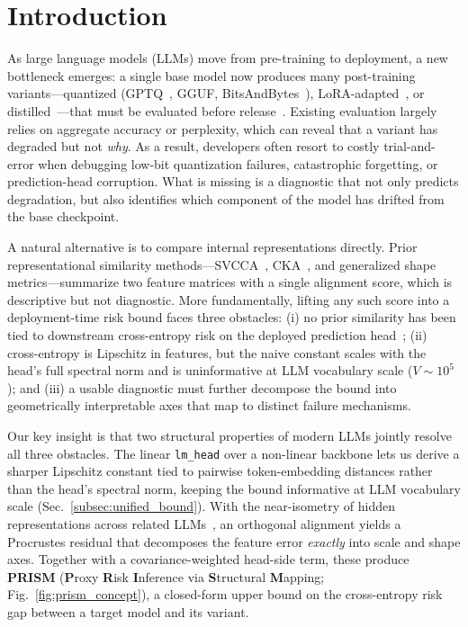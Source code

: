 \section{Introduction}

As large language models (LLMs) move from pre-training to deployment, a new bottleneck emerges: a single base model now produces many post-training variants---quantized (GPTQ~\cite{frantar2022gptq}, GGUF, BitsAndBytes~\cite{dettmers2022gpt3}), LoRA-adapted~\cite{hu2022lora}, or distilled~\cite{hinton2015distilling}---that must be evaluated before release~\cite{grattafiori2024llama, qwen2025qwen3}. Existing evaluation largely relies on aggregate accuracy or perplexity, which can reveal that a variant has degraded but not \emph{why}. As a result, developers often resort to costly trial-and-error when debugging low-bit quantization failures, catastrophic forgetting, or prediction-head corruption. What is missing is a diagnostic that not only predicts degradation, but also identifies which component of the model has drifted from the base checkpoint.

A natural alternative is to compare internal representations directly. Prior representational similarity methods---SVCCA~\cite{raghu2017svcca}, CKA~\cite{kornblith2019similarity}, and generalized shape metrics---summarize two feature matrices with a single alignment score, which is descriptive but not diagnostic. More fundamentally, lifting any such score into a deployment-time risk bound faces three obstacles: (i) no prior similarity has been tied to downstream cross-entropy risk on the deployed prediction head~\cite{ding2021grounding, davari2023reliability, klabunde2023similarity}; (ii) cross-entropy is Lipschitz in features, but the naive constant scales with the head's full spectral norm and is uninformative at LLM vocabulary scale ($V\sim 10^5$); and (iii) a usable diagnostic must further decompose the bound into geometrically interpretable axes that map to distinct failure mechanisms.

Our key insight is that two structural properties of modern LLMs jointly resolve all three obstacles. The linear \texttt{lm\_head} over a non-linear backbone lets us derive a sharper Lipschitz constant tied to pairwise token-embedding distances rather than the head's spectral norm, keeping the bound informative at LLM vocabulary scale (Sec.~\ref{subsec:unified_bound}). With the near-isometry of hidden representations across related LLMs~\cite{park2023linear, moschella2022relative}, an orthogonal alignment yields a Procrustes residual that decomposes the feature error \emph{exactly} into scale and shape axes. Together with a covariance-weighted head-side term, these produce \textbf{PRISM} (\textbf{P}roxy \textbf{R}isk \textbf{I}nference via \textbf{S}tructural \textbf{M}apping; Fig.~\ref{fig:prism_concept}), a closed-form upper bound on the cross-entropy risk gap between a target model and its variant.

